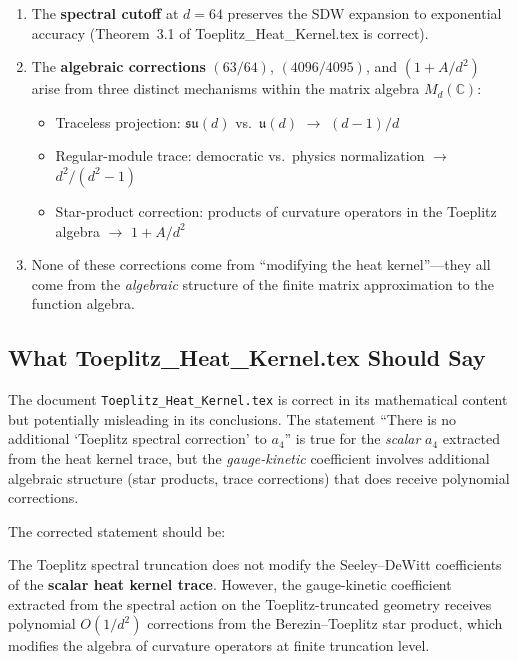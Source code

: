 \documentclass[12pt,a4paper]{article}
\theoremstyle{definition}
\begin{document}
\begin{enumerate}
\item The \textbf{spectral cutoff} at $d = 64$ preserves the SDW
  expansion to exponential accuracy (Theorem~3.1 of
  Toeplitz\_Heat\_Kernel.tex is correct).

\item The \textbf{algebraic corrections} $(63/64)$, $(4096/4095)$, and
  $(1 + A/d^2)$ arise from three distinct mechanisms within the matrix
  algebra $M_d(\mathbb{C})$:
  \begin{itemize}
  \item Traceless projection: $\mathfrak{su}(d)$ vs.\
    $\mathfrak{u}(d)$ $\to$ $(d-1)/d$
  \item Regular-module trace: democratic vs.\ physics normalization
    $\to$ $d^2/(d^2-1)$
  \item Star-product correction: products of curvature operators in
    the Toeplitz algebra $\to$ $1 + A/d^2$
  \end{itemize}

\item None of these corrections come from ``modifying the heat kernel''---they
  all come from the \emph{algebraic} structure of the finite matrix
  approximation to the function algebra.
\end{enumerate}

\subsection{What Toeplitz\_Heat\_Kernel.tex Should Say}

The document \texttt{Toeplitz\_Heat\_Kernel.tex} is correct in its
mathematical content but potentially misleading in its conclusions.
The statement ``There is no additional `Toeplitz spectral correction'
to $a_4$'' is true for the \emph{scalar} $a_4$ extracted from the heat
kernel trace, but the \emph{gauge-kinetic} coefficient involves
additional algebraic structure (star products, trace corrections) that
does receive polynomial corrections.

The corrected statement should be:

\begin{tcolorbox}[colback=yellow!10!white, colframe=orange!60!black,
  title=Corrected Conclusion]
The Toeplitz spectral truncation does not modify the Seeley--DeWitt
coefficients of the \textbf{scalar heat kernel trace}.  However, the
gauge-kinetic coefficient extracted from the spectral action on the
Toeplitz-truncated geometry receives polynomial $O(1/d^2)$ corrections
from the Berezin--Toeplitz star product, which modifies the algebra of
curvature operators at finite truncation level.
\end{tcolorbox}
\end{document}
